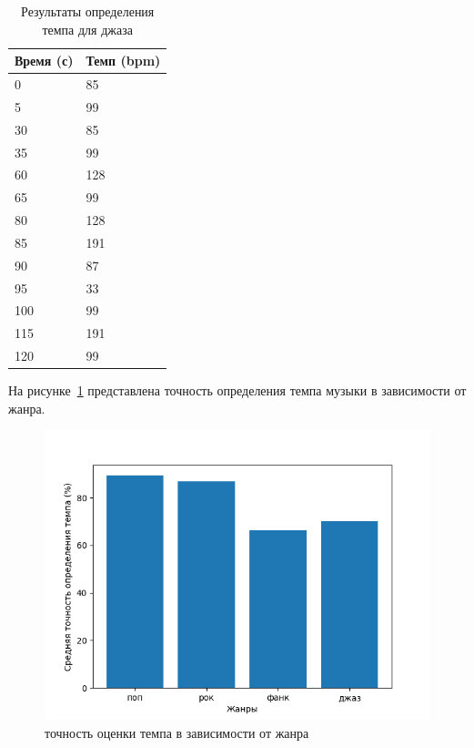 \begin{table}[!h]
	\begin{center}
		\caption{\label{tab:tempo_jazz}Результаты определения темпа для джаза}
		\begin{tabular}{|p{8cm}|p{8cm}|}
			\hline
			\textbf{Время (с)} & \textbf{Темп (bpm)}\\
			\hline
			0 & 85\\
			\hline
			5 & 99\\
			\hline
			30 & 85\\
			\hline
			35 & 99\\
			\hline
			60 & 128\\
			\hline
			65 & 99\\
			\hline
			80 & 128\\
			\hline
			85 & 191\\
			\hline
			90 & 87\\
			\hline
			95 & 33\\
			\hline
			100 & 99\\
			\hline
			115 & 191\\
			\hline
			120 & 99\\
			\hline
		\end{tabular}
	\end{center}
\end{table}

\newpage

На рисунке~\ref{img:tempo_genres} представлена точность определения темпа музыки в зависимости от жанра.

\begin{figure}[h]
	\centering
	\includegraphics[scale=1]{../graphs/tempo_genres.png}
	\caption{точность оценки темпа в зависимости от жанра}
	\label{img:tempo_genres}
\end{figure}

